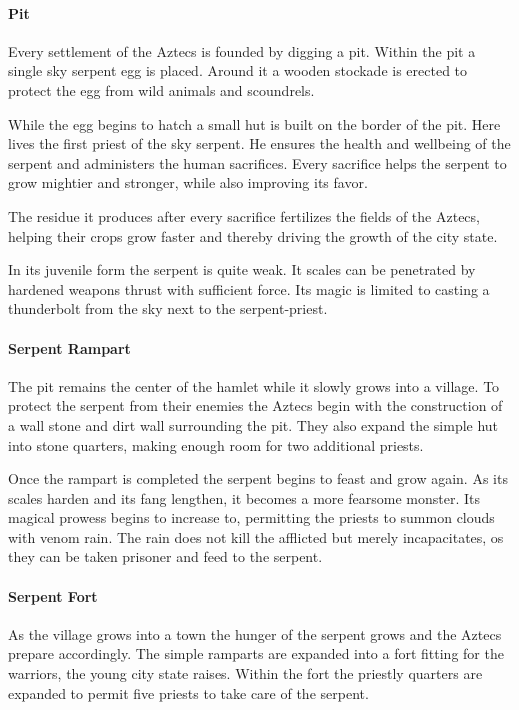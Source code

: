 \documentclass[a4paper]{book}
\begin{document}
\paragraph{Pit}
Every settlement of the \gls{Aztecs} is founded by digging a pit. Within the
pit a single sky serpent egg is placed. Around it a wooden stockade is erected
to protect the egg from wild animals and scoundrels.

While the egg begins to hatch a small hut is built on the border of the pit.
Here lives the first priest of the sky serpent. He ensures the health and
wellbeing of the serpent and administers the human sacrifices. Every sacrifice
helps the serpent to grow mightier and stronger, while also improving its
favor.

The residue it produces after every sacrifice fertilizes the fields of the
\gls{Aztecs}, helping their crops grow faster and thereby driving the growth of
the city state.

In its juvenile form the serpent is quite weak. It scales can be penetrated by
hardened weapons thrust with sufficient force. Its magic is limited to casting
a thunderbolt from the sky next to the serpent-priest.

\paragraph{Serpent Rampart}
The pit remains the center of the hamlet while it slowly grows into a village.
To protect the serpent from their enemies the \gls{Aztecs} begin with the
construction of a wall stone and dirt wall surrounding the pit. They also
expand the simple hut into stone quarters, making enough room for two
additional priests.

Once the rampart is completed the serpent begins to feast and grow again. As
its scales harden and its fang lengthen, it becomes a more fearsome monster.
Its magical prowess begins to increase to, permitting the priests to summon
clouds with venom rain. The rain does not kill the afflicted but merely
incapacitates, os they can be taken prisoner and feed to the serpent.

\paragraph{Serpent Fort}
As the village grows into a town the hunger of the serpent grows and the
\gls{Aztecs} prepare accordingly. The simple ramparts are expanded into a fort
fitting for the warriors, the young city state raises. Within the fort the
priestly quarters are expanded to permit five priests to take care of the
serpent.
\end{document}
